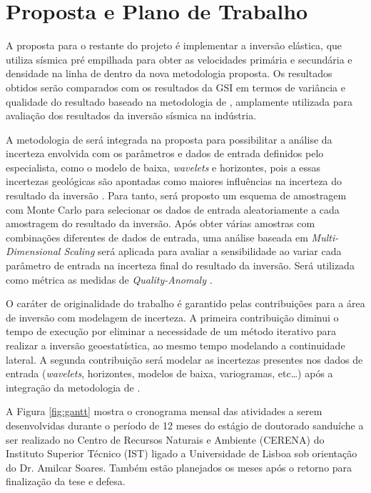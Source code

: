 \section{Proposta e Plano de Trabalho}

A proposta para o restante do projeto é implementar a inversão elástica, que
utiliza sísmica pré empilhada para obter as velocidades primária e secundária e
densidade na linha de \cite{azevedo2013_avoinv} dentro da nova metodologia
proposta. Os resultados obtidos serão comparados com os resultados da GSI em
termos de variância e qualidade do resultado baseado na metodologia de
\cite{coleou_qualityanomalyinv}, amplamente utilizada para avaliação dos
resultados da inversão sísmica na indústria.

A metodologia de \cite{caers_distance_kernels_MDS} será integrada na proposta
para possibilitar a análise da incerteza envolvida com os parâmetros e dados de
entrada definidos pelo especialista, como o modelo de baixa, \textit{wavelets} e
horizontes, pois a essas incertezas geológicas são apontadas como maiores
influências na incerteza do resultado da inversão \citep[p.
133]{caers2011modeling}. Para tanto, será proposto um esquema de amostragem com
Monte Carlo para selecionar os dados de entrada aleatoriamente a cada amostragem
do resultado da inversão. Após obter várias amostras com combinações diferentes
de dados de entrada, uma análise baseada em \textit{Multi-Dimensional Scaling}
será aplicada para avaliar a sensibilidade ao variar cada parâmetro de entrada
na incerteza final do resultado da inversão. Será utilizada como métrica as
medidas de \textit{Quality-Anomaly} \citep{coleou_qualityanomalyinv}.

O caráter de originalidade do trabalho é garantido pelas contribuições para a
área de inversão com modelagem de incerteza. A primeira contribuição diminui o
tempo de execução por eliminar a necessidade de um método iterativo para
realizar a inversão geoestatística, ao mesmo tempo modelando a continuidade
lateral. A segunda contribuição será modelar as incertezas presentes nos dados
de entrada (\textit{wavelets}, horizontes, modelos de baixa, variogramas,
etc\ldots) após a integração da metodologia de
\cite{caers_distance_kernels_MDS}.

A Figura \ref{fig:gantt} mostra o cronograma mensal das atividades a serem
desenvolvidas durante o período de 12 meses do estágio de doutorado sanduíche a
ser realizado no Centro de Recursos Naturais e Ambiente (CERENA) do Instituto
Superior Técnico (IST) ligado a Universidade de Lisboa sob orientação do Dr.
Amilcar Soares. Também estão planejados os meses após o retorno para finalização
da tese e defesa.



